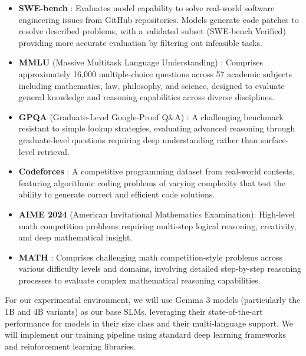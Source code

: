 \documentclass[11pt, oneside]{article}   	%
\begin{document}
\begin{itemize}
	\item \textbf{SWE-bench} \cite{jimenez2024swebenchlanguagemodelsresolve}: Evaluates model capability to solve real-world software engineering issues from GitHub repositories. Models generate code patches to resolve described problems, with a validated subset (SWE-bench Verified) providing more accurate evaluation by filtering out infeasible tasks.

	\item \textbf{MMLU} (Massive Multitask Language Understanding) \cite{hendrycks2021measuringmassivemultitasklanguage}: Comprises approximately 16,000 multiple-choice questions across 57 academic subjects including mathematics, law, philosophy, and science, designed to evaluate general knowledge and reasoning capabilities across diverse disciplines.

	\item \textbf{GPQA} (Graduate-Level Google-Proof Q\&A) \cite{rein2023gpqagraduatelevelgoogleproofqa}: A challenging benchmark resistant to simple lookup strategies, evaluating advanced reasoning through graduate-level questions requiring deep understanding rather than surface-level retrieval.

	\item \textbf{Codeforces} \cite{quan2025codeelobenchmarkingcompetitionlevelcode}: A competitive programming dataset from real-world contests, featuring algorithmic coding problems of varying complexity that test the ability to generate correct and efficient code solutions.

	\item \textbf{AIME 2024} (American Invitational Mathematics Examination): High-level math competition problems requiring multi-step logical reasoning, creativity, and deep mathematical insight.

	\item \textbf{MATH} \cite{hendrycks2021measuringmathematicalproblemsolving}: Comprises challenging math competition-style problems across various difficulty levels and domains, involving detailed step-by-step reasoning processes to evaluate complex mathematical reasoning capabilities.
\end{itemize}

For our experimental environment, we will use Gemma 3 models (particularly the 1B and 4B variants) as our base SLMs, leveraging their state-of-the-art performance for models in their size class and their multi-language support. We will implement our training pipeline using standard deep learning frameworks and reinforcement learning libraries.
\end{document}
